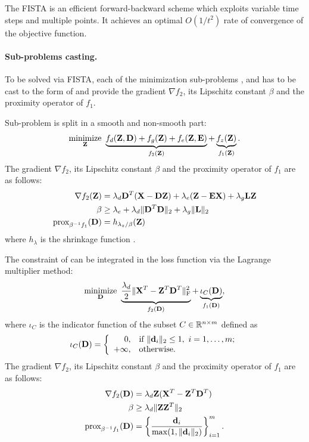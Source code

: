 The \gls{FISTA} \cite{beck2009FISTA} is an efficient forward-backward scheme which exploits variable time steps and multiple points. It achieves an optimal \cite{nemirovsky1983optimalConvergence} $O(1/t^2)$ rate of convergence of the objective function.

\paragraph{Sub-problems casting.}
To be solved via \gls{FISTA}, each of the minimization sub-problems ,  and  has to be cast to the form of  and provide the gradient $\nabla f_2$, its Lipschitz constant $\beta$ and the proximity operator of $f_1$.

Sub-problem  is split in a smooth and non-smooth part:
\begin{equation}
	\operatorname*{minimize}\limits_{\mathbf{Z}} \  \underbrace{f_d(\mathbf{Z}, \mathbf{D}) + f_g(\mathbf{Z}) + f_e(\mathbf{Z}, \mathbf{E})}_{f_2(\mathbf{Z})} + \underbrace{f_z(\mathbf{Z})}_{f_1(\mathbf{Z})}.
\end{equation}
The gradient $\nabla f_2$, its Lipschitz constant $\beta$ and the proximity operator of $f_1$ are as follows:
\begin{align}
	\nabla f_2(\mathbf{Z}) &= \lambda_d \mathbf{D}^T (\mathbf{X} - \mathbf{D} \mathbf{Z}) + \lambda_e (\mathbf{Z} - \mathbf{E} \mathbf{X}) + \lambda_g \mathbf{L} \mathbf{Z} \\
	\beta &\geq \lambda_e + \lambda_d \| \mathbf{D}^T \mathbf{D} \|_2 + \lambda_g \|\mathbf{L}\|_2 \\
	\text{prox}_{\beta^{-1} f_1}(\mathbf{D}) &= h_{\lambda_z / \beta} (\mathbf{Z})
\end{align}
where $h_\lambda$ is the shrinkage function .

The constraint of  can be integrated in the loss function via the Lagrange multiplier method:
\begin{equation}
	\operatorname*{minimize}\limits_{\mathbf{D}} \  \underbrace{\frac{\lambda_d}{2} \| \mathbf{X}^T - \mathbf{Z}^T\mathbf{D}^T \|_\text{F}^2}_{f_2(\mathbf{D})} + \underbrace{\iota_C(\mathbf{D})}_{f_1(\mathbf{D})},
\end{equation}
where $\iota_C$ is the indicator function of the subset $C \in \mathbb{R}^{n \times m}$ defined as
\begin{equation}
	\iota_C(\mathbf{D}) = \left\{ \begin{array}{rl}
	0, & \text{if } \|\mathbf{d}_i\|_2 \leq 1, \ i = 1, \ldots, m; \\
	+\infty, & \text{otherwise}.
	\end{array}\right.
\end{equation}
The gradient $\nabla f_2$, its Lipschitz constant $\beta$ and the proximity operator of $f_1$ are as follows:
\begin{align}
	\nabla f_2(\mathbf{D}) &= \lambda_d \mathbf{Z} (\mathbf{X}^T - \mathbf{Z}^T \mathbf{D}^T) \\
	\beta &\geq \lambda_d \| \mathbf{Z} \mathbf{Z}^T \|_2 \\
	\text{prox}_{\beta^{-1} f_1}(\mathbf{D}) &= \left\{ \frac{\mathbf{d}_i}{\max(1, \|\mathbf{d}_i\|_2)} \right\}_{i=1}^m.
\end{align}

